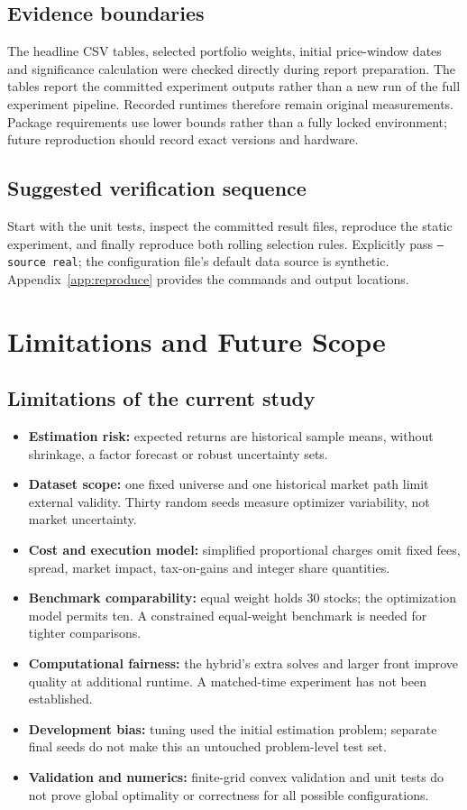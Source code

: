 \documentclass[12pt,a4paper]{article}
\newcommand{\newsec}[1]{\section{#1}}
\begin{document}
\subsection{Evidence boundaries}
The headline CSV tables, selected portfolio weights, initial price-window dates and significance calculation were checked directly during report preparation. The tables report the committed experiment outputs rather than a new run of the full experiment pipeline. Recorded runtimes therefore remain original measurements. Package requirements use lower bounds rather than a fully locked environment; future reproduction should record exact versions and hardware.
\subsection{Suggested verification sequence}
Start with the unit tests, inspect the committed result files, reproduce the static experiment, and finally reproduce both rolling selection rules. Explicitly pass \texttt{--source real}; the configuration file's default data source is synthetic. Appendix~\ref{app:reproduce} provides the commands and output locations.

\newsec{Limitations and Future Scope}\label{sec:future}
\subsection{Limitations of the current study}
\begin{itemize}
\item \textbf{Estimation risk:} expected returns are historical sample means, without shrinkage, a factor forecast or robust uncertainty sets.
\item \textbf{Dataset scope:} one fixed universe and one historical market path limit external validity. Thirty random seeds measure optimizer variability, not market uncertainty.
\item \textbf{Cost and execution model:} simplified proportional charges omit fixed fees, spread, market impact, tax-on-gains and integer share quantities.
\item \textbf{Benchmark comparability:} equal weight holds 30 stocks; the optimization model permits ten. A constrained equal-weight benchmark is needed for tighter comparisons.
\item \textbf{Computational fairness:} the hybrid's extra solves and larger front improve quality at additional runtime. A matched-time experiment has not been established.
\item \textbf{Development bias:} tuning used the initial estimation problem; separate final seeds do not make this an untouched problem-level test set.
\item \textbf{Validation and numerics:} finite-grid convex validation and unit tests do not prove global optimality or correctness for all possible configurations.
\end{itemize}
\end{document}
